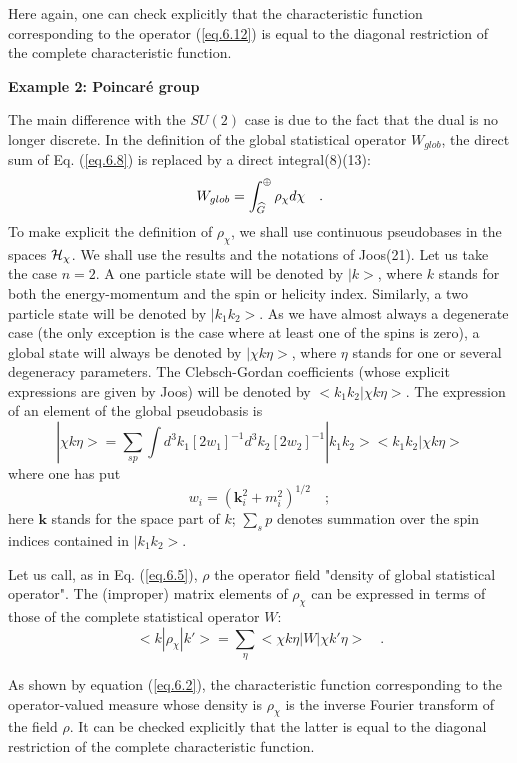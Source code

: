 \documentclass[a4paper,11pt]{article}
\begin{document}
Here again, one can check explicitly that the characteristic function corresponding to the 
operator (\ref{eq.6.12}) is equal to the diagonal restriction of the complete characteristic 
function.

{\bf Example 2: Poincar\'e group}

The main difference with the $SU(2)$ case is due to the fact that the dual is no longer 
discrete. 
In the definition of the global statistical operator $W_{glob}$, the direct sum of Eq. 
(\ref{eq.6.8}) is replaced by a direct integral(8)(13):
\begin{equation}
 \label{eq.6.15}
       W_{glob} = \int_{\widehat{G}}^{\oplus} \rho_{\chi} d\chi   \quad .
\end{equation}
To make explicit the definition of $\rho_{\chi}$, we shall use continuous pseudobases in the 
spaces $\mathcal{H}_{\chi}$. We 
shall use the results and the notations of Joos(21). Let us take the case $n = 2$. A one 
particle 
state will be denoted by $|k>$, where $k$ stands for both the energy-momentum and the spin or 
helicity index. Similarly, a two particle state will be denoted by $|k_1k_2>$. As we have 
almost 
always a degenerate case (the only exception is the case where at least one of the spins is 
zero), a global state will always be denoted by $|\chi k \eta>$, where $\eta$ stands for one or 
several 
degeneracy parameters. The Clebsch-Gordan coefficients (whose explicit expressions are given by 
Joos) will be denoted by  $<k_1k_2 | \chi k \eta>$. The expression of an element of the global 
pseudobasis is
$$
| \chi k \eta> = \sum_{sp}\int d^3 k_1 [2w_1]^{-1} d^3 k_2 [2w_2]^{-1} | k_1k_2 ><k_1k_2 | \chi k \eta >
$$
 where one has put
$$
  w_i = (\mathbf{k}_i^2+m_i^2)^{1/2}  \quad  ;
$$
here $\mathbf{k}$ stands for the space part of $k$; 
$\sum_sp$ denotes summation over the spin indices contained in $| k_1k_2>$.
 
Let us call, as in Eq. (\ref{eq.6.5}), $\rho$ the operator field "density of global statistical 
operator". 
The (improper) matrix elements of $\rho_{\chi}$ can be expressed in terms of those of the 
complete statistical operator $W$:
\begin{equation}
 \label{eq.6.16}
       <k |\rho_{\chi} | k'> = \sum_{\eta} < \chi k \eta | W |\chi k' \eta >  \quad .
\end{equation}

As shown by equation (\ref{eq.6.2}), the characteristic function corresponding to the 
operator-valued 
measure whose density is $\rho_{\chi}$ is the inverse Fourier transform of the field $\rho$. It 
can be checked 
explicitly that the latter is equal to the diagonal restriction of the complete characteristic 
function. 
\end{document}
